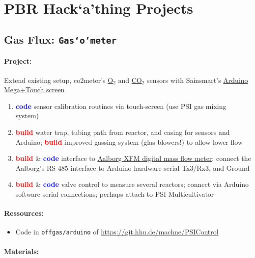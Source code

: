 \documentclass[12pt,a4paper]{scrartcl}
\newcommand{\build}[0]{\textcolor{red}{\textbf{build}}}
\newcommand{\code}[0]{\textcolor{blue}{\textbf{code}}}
\newcommand{\hack}[0]{Hack`a'thing}
\newcommand{\gasometer}[0]{\texttt{Gas`o'meter}}
\newcommand{\ox}[0]{O$_2$}
\newcommand{\cox}[0]{CO$_2$}
\begin{document}
\section{PBR \hack{} Projects}
\label{proj}


\subsection{Gas Flux: \gasometer{}}
\label{gas}
\paragraph{Project:} 
Extend existing setup, co2meter's
\href{http://www.co2meter.com/collections/co2-sensors/oxygen-sensors}{\ox{}}
and
\href{http://www.co2meter.com/collections/co2-sensors/products/cozir-5-100-co2-sensor}{\cox{}}
sensors with Sainsmart's
\href{http://www.sainsmart.com/featured-products/sainsmart-mega2560-board-3-5-tft-lcd-module-display-shield-kit-for-atmel-atmega-avr-16au-atmega8u2.html}{Arduino
  Mega+Touch screen}

\begin{enumerate}
\item \code{} sensor calibration routines via touch-screen (use PSI
  gas mixing system)
\item \build{} water trap, tubing path from reactor, and casing for
  sensors and Arduino; \build{} improved gassing system (glas
  blowers!) to allow lower flow
\item \build{} \& \code{} interface to \href{http://www.aalborg.com/index.php/main_page/product_overview/id_product_overview/63}{Aalborg XFM digital mass flow
  meter}: connect the Aalborg's RS 485 interface to Arduino hardware
  serial Tx3/Rx3, and Ground
\item \build{} \& \code{} valve control to measure several reactors;
  connect via Arduino software serial connections; perhaps attach to
  PSI Multicultivator
\end{enumerate}

\paragraph{Ressources:}
\begin{itemize}
\item Code in  \texttt{offgas/arduino} of
  \url{https://git.hhu.de/machne/PSIControl} 
\end{itemize}

\paragraph{Materials:}
\end{document}
